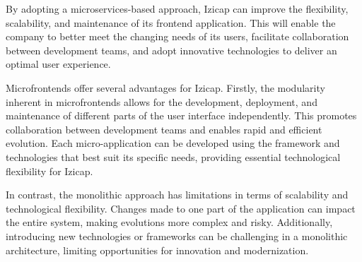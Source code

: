 By adopting a microservices-based approach, Izicap can improve the flexibility, scalability, and maintenance of its frontend application. This will enable the company to better meet the changing needs of its users, facilitate collaboration between development teams, and adopt innovative technologies to deliver an optimal user experience.

Microfrontends offer several advantages for Izicap. Firstly, the modularity inherent in microfrontends allows for the development, deployment, and maintenance of different parts of the user interface independently. This promotes collaboration between development teams and enables rapid and efficient evolution. Each micro-application can be developed using the framework and technologies that best suit its specific needs, providing essential technological flexibility for Izicap.

In contrast, the monolithic approach has limitations in terms of scalability and technological flexibility. Changes made to one part of the application can impact the entire system, making evolutions more complex and risky. Additionally, introducing new technologies or frameworks can be challenging in a monolithic architecture, limiting opportunities for innovation and modernization.